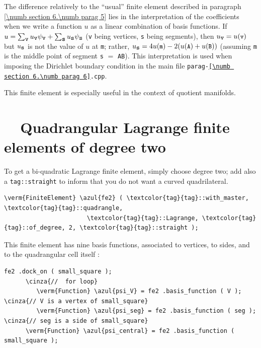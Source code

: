 The difference relatively to the ``usual'' finite element described in paragraph
\ref{\numb section 6.\numb parag 5} lies in the interpretation
of the coefficients when we write a function $u$ as a linear combination of basis functions.
If $ u = \sum_{\mbox{\small\tt v}} u_{\mbox{\small\tt v}} \psi_{\mbox{\small\tt v}} +
\sum_{\mbox{\small\tt s}} u_{\mbox{\small\tt s}} \psi_{\mbox{\small\tt s}} $
({\small\tt v} being vertices, {\small\tt s} being segments), then $ u_{\mbox{\small\tt v}} =
u(\mbox{\small\tt v}) $ but $ u_{\mbox{\small\tt s}} $ is not the value of $u$ at {\small\tt m};
rather, $ u_{\mbox{\small\tt s}} = 4 u(\mbox{\small\tt m}) -2 (u(\mbox{\small\tt A}) +
u(\mbox{\small\tt B})) $ (assuming {\small\tt m} is the middle point of segment {\small\tt s}
$=$ {\small\tt AB}).
This interpretation is used when imposing the Dirichlet boundary condition in the main file
{\small\tt parag-\ref{\numb section 6.\numb parag 6}.cpp}.

This finite element is especially useful in the context of quotient manifolds.


\section{~~Quadrangular Lagrange finite elements of degree two}
\label{\numb section 6.\numb parag 7}

To get a bi-quadratic Lagrange finite element, simply choose degree two; add also a 
{\small\tt\textcolor{tag}{tag}::straight} to inform {\maniFEM} that you do not want
a curved quadrilateral.

\begin{Verbatim}[commandchars=\\\{\},formatcom=\small\tt,frame=single,
   label=parag-\ref{\numb section 6.\numb parag 7}.cpp,rulecolor=\color{moldura},
   baselinestretch=0.94,framesep=2mm                                            ]
   \verm{FiniteElement} \azul{fe2} ( \textcolor{tag}{tag}::with_master, \textcolor{tag}{tag}::quadrangle,
                       \textcolor{tag}{tag}::Lagrange, \textcolor{tag}{tag}::of_degree, 2, \textcolor{tag}{tag}::straight );
\end{Verbatim}

This finite element has nine basis functions, associated to vertices, to sides, and to the
quadrangular cell itself :

\begin{Verbatim}[commandchars=\\\{\},formatcom=\small\tt,frame=single,
   label=parag-\ref{\numb section 6.\numb parag 7}.cpp,rulecolor=\color{moldura},
   baselinestretch=0.94,framesep=2mm                                            ]
      fe2 .dock_on ( small_square );
      \cinza{//  for loop}  
         \verm{Function} \azul{psi_V} = fe2 .basis_function ( V );   \cinza{// V is a vertex of small_square}
         \verm{Function} \azul{psi_seg} = fe2 .basis_function ( seg );  \cinza{// seg is a side of small_square}
      \verm{Function} \azul{psi_central} = fe2 .basis_function ( small_square );
\end{Verbatim}

